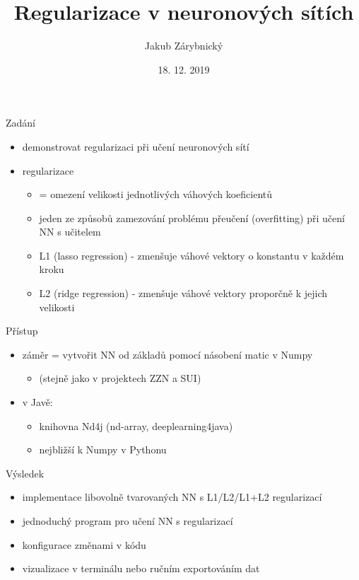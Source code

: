 \documentclass[presentation]{beamer}
\author{Jakub Zárybnický}
\date{18. 12. 2019}
\title{Regularizace v neuronových sítích}
\begin{document}
\maketitle

\begin{frame}[label={sec:orgbbc10c9}]{Zadání}
\begin{itemize}
\item demonstrovat regularizaci při učení neuronových sítí
\item regularizace
\begin{itemize}
\item = omezení velikosti jednotlivých váhových koeficientů
\item jeden ze způsobů zamezování problému přeučení (overfitting) při učení NN s učitelem
\item L1 (lasso regression) - zmenšuje váhové vektory o konstantu v každém kroku
\item L2 (ridge regression) - zmenšuje váhové vektory proporčně k jejich velikosti
\end{itemize}
\end{itemize}
\end{frame}

\begin{frame}[label={sec:orgf510ca8}]{Přístup}
\begin{itemize}
\item záměr = vytvořit NN od základů pomocí násobení matic v Numpy
\begin{itemize}
\item (stejně jako v projektech ZZN a SUI)
\end{itemize}
\item v Javě:
\begin{itemize}
\item knihovna Nd4j (nd-array, deeplearning4java)
\item nejbližší k Numpy v Pythonu
\end{itemize}
\end{itemize}
\end{frame}

\begin{frame}[label={sec:org77b6584}]{Výsledek}
\begin{itemize}
\item implementace libovolně tvarovaných NN s L1/L2/L1+L2 regularizací
\item jednoduchý program pro učení NN s regularizací
\item konfigurace změnami v kódu
\item vizualizace v terminálu nebo ručním exportováním dat
\end{itemize}
\end{frame}
\end{document}
